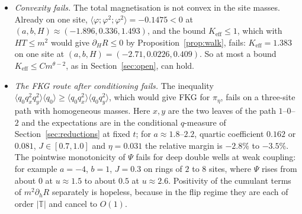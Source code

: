 \begin{itemize}
\item[(O5)] \emph{Convexity fails.} The total magnetisation is not convex in the site masses. Already on one site, $\langle\varphi;\varphi^2;\varphi^2\rangle=-0.1475<0$ at $(a,b,H)\approx(-1.896,0.336,1.493)$, and the bound $K_{\mathrm{eff}}\le1$, which with $HT\le m^2$ would give $\partial_HR\le0$ by Proposition~\ref{prop:walk}, fails: $K_{\mathrm{eff}}=1.383$ on one site at $(a,b,H)=(-2.71,0.0226,0.409)$. So at most a bound $K_{\mathrm{eff}}\le Cm^{\theta-2}$, as in Section~\ref{sec:open}, can hold.
\item[(O6)] \emph{The FKG route after conditioning fails.} The inequality $\langle q_0q_x^2q_y^2\rangle\langle q_0\rangle\ge\langle q_0q_x^2\rangle\langle q_0q_y^2\rangle$, which would give FKG for $\pi_\eta$, fails on a three-site path with homogeneous masses. Here $x,y$ are the two leaves of the path $1$--$0$--$2$ and the expectations are in the conditional $q$-measure of Section~\ref{sec:reductions} at fixed $t$; for $a\approx1.8$--$2.2$, quartic coefficient $0.162$ or $0.081$, $J\in[0.7,1.0]$ and $\eta=0.031$ the relative margin is $-2.8\%$ to $-3.5\%$. The pointwise monotonicity of $\Psi$ fails for deep double wells at weak coupling: for example $a=-4$, $b=1$, $J=0.3$ on rings of $2$ to $8$ sites, where $\Psi$ rises from about $0$ at $u\approx1.5$ to about $0.5$ at $u\approx2.6$. Positivity of the cumulant terms of $m^2\partial_hR$ separately is hopeless, because in the flip regime they are each of order $|\mathbb T|$ and cancel to $O(1)$.

\end{itemize}
